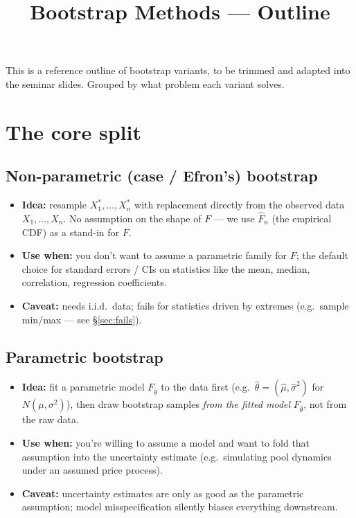 \documentclass[11pt]{article}
\title{\vspace{-1.5em}Bootstrap Methods --- Outline}
\author{}
\date{}
\begin{document}
\maketitle
\vspace{-2.5em}

This is a reference outline of bootstrap variants, to be trimmed and adapted into the seminar slides. Grouped by what problem each variant solves.

\section{The core split}

\subsection*{Non-parametric (case / Efron's) bootstrap}
\begin{itemize}
  \item \textbf{Idea:} resample $X_1^*,\dots,X_n^*$ with replacement directly from the observed data $X_1,\dots,X_n$. No assumption on the shape of $F$ --- we use $\widehat F_n$ (the empirical CDF) as a stand-in for $F$.
  \item \textbf{Use when:} you don't want to assume a parametric family for $F$; the default choice for standard errors / CIs on statistics like the mean, median, correlation, regression coefficients.
  \item \textbf{Caveat:} needs i.i.d.\ data; fails for statistics driven by extremes (e.g.\ sample min/max --- see \S\ref{sec:fails}).
\end{itemize}

\subsection*{Parametric bootstrap}
\begin{itemize}
  \item \textbf{Idea:} fit a parametric model $F_{\hat\theta}$ to the data first (e.g.\ $\hat\theta = (\hat\mu,\hat\sigma^2)$ for $N(\mu,\sigma^2)$), then draw bootstrap samples \emph{from the fitted model} $F_{\hat\theta}$, not from the raw data.
  \item \textbf{Use when:} you're willing to assume a model and want to fold that assumption into the uncertainty estimate (e.g.\ simulating pool dynamics under an assumed price process).
  \item \textbf{Caveat:} uncertainty estimates are only as good as the parametric assumption; model misspecification silently biases everything downstream.
\end{itemize}
\end{document}
